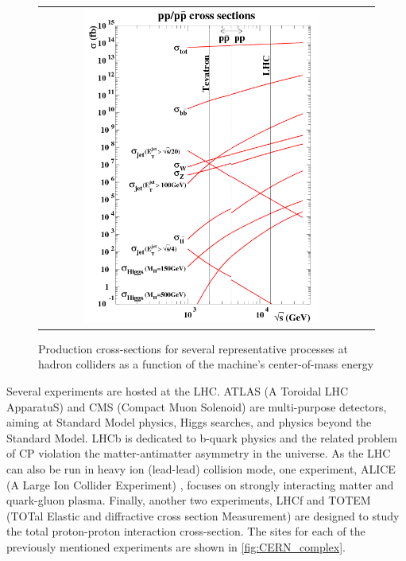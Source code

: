 \begin{figure}[tbh!]
	\centering
	\begin{tabular}{cc}
		\includegraphics[width=0.75\textwidth]{detector/pics/LHC_xsec.png}
	\end{tabular}
	\caption{Production cross-sections for several representative processes at hadron colliders as a function of the machine's center-of-mass energy}
	\label{fig:LHC_xsec}
\end{figure}


Several experiments are hosted at the LHC. ATLAS (A Toroidal LHC ApparatuS) \cite{det::ATLAS} and CMS (Compact Muon Solenoid) \cite{Chatrchyan:2008zzk} are multi-purpose detectors, aiming at Standard Model physics, Higgs searches, and physics beyond the Standard Model. LHCb \cite{det::LHCb} is dedicated to b-quark physics and the related problem of CP violation the matter-antimatter asymmetry in the universe. As the LHC can also be run in heavy ion (lead-lead) collision mode, one experiment, ALICE (A Large Ion Collider Experiment) \cite{det::ALICE}, focuses on strongly interacting matter and quark-gluon plasma. Finally, another two experiments, LHCf \cite{Adriani:2008zz} and TOTEM (TOTal Elastic and diffractive cross section Measurement) \cite{Anelli:2008zza} are designed to study the total proton-proton interaction cross-section. The sites for each of the previously mentioned experiments are shown in \autoref{fig:CERN_complex}. 

